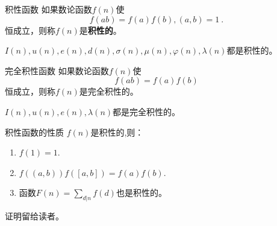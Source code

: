 

\begin{issues}
\issueAbstract
\end{issues}

\begin{definition}{积性函数}
如果数论函数$f(n)$使
\begin{equation}
f(ab)=f(a)f(b),(a,b)=1~.
\end{equation}
恒成立，则称$f(n)$是\textbf{积性的}。
\end{definition}

\begin{example}{}
$I(n),u(n),e(n),d(n),\sigma(n),\mu(n),\varphi(n),\lambda(n)$都是积性的。
\end{example}

\begin{definition}{完全积性函数}
如果数论函数$f(n)$使
\begin{equation}
f(ab)=f(a)f(b)
\end{equation}
恒成立，则称$f(n)$是完全积性的。
\end{definition}

\begin{example}{}
$I(n),u(n),e(n),\lambda(n)$都是完全积性的。
\end{example}

\begin{theorem}{积性函数的性质}
$f(n)$是积性的,则：
\begin{enumerate}
\item $f(1)=1$.
\item $f((a,b))f([a,b])=f(a)f(b)$.
\item 函数$F(n)=\sum\limits_{d|n}f(d)$也是积性的。
\end{enumerate}
\end{theorem}

证明留给读者。